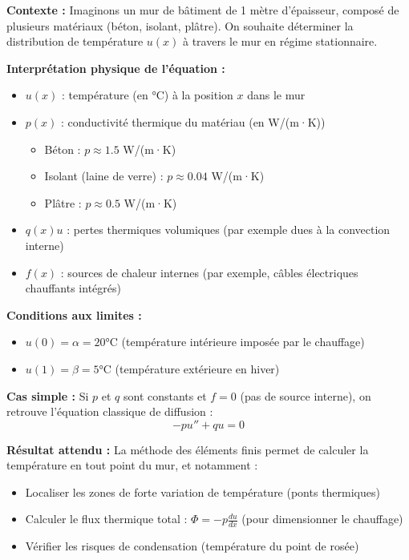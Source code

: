 \documentclass[11pt,a4paper]{report}
\begin{document}
\begin{exempleBox}
\textbf{Contexte :} Imaginons un mur de bâtiment de 1 mètre d'épaisseur, composé de plusieurs matériaux (béton, isolant, plâtre). On souhaite déterminer la distribution de température $u(x)$ à travers le mur en régime stationnaire.

\vspace{0.3cm}

\textbf{Interprétation physique de l'équation :}

\begin{itemize}
    \item \textbf{$u(x)$} : température (en °C) à la position $x$ dans le mur
    \item \textbf{$p(x)$} : conductivité thermique du matériau (en W/(m·K))
    \begin{itemize}
        \item Béton : $p \approx 1.5$ W/(m·K)
        \item Isolant (laine de verre) : $p \approx 0.04$ W/(m·K)
        \item Plâtre : $p \approx 0.5$ W/(m·K)
    \end{itemize}
    \item \textbf{$q(x) u$} : pertes thermiques volumiques (par exemple dues à la convection interne)
    \item \textbf{$f(x)$} : sources de chaleur internes (par exemple, câbles électriques chauffants intégrés)
\end{itemize}

\vspace{0.3cm}


\textbf{Conditions aux limites :}
\begin{itemize}
    \item $u(0) = \alpha = 20$°C (température intérieure imposée par le chauffage)
    \item $u(1) = \beta = 5$°C (température extérieure en hiver)
\end{itemize}

\vspace{0.3cm}

\textbf{Cas simple :} Si $p$ et $q$ sont constants et $f = 0$ (pas de source interne), on retrouve l'équation classique de diffusion :
\[
-p u'' + q u = 0
\]

\textbf{Résultat attendu :} La méthode des éléments finis permet de calculer la température en tout point du mur, et notamment :
\begin{itemize}
    \item Localiser les zones de forte variation de température (ponts thermiques)
    \item Calculer le flux thermique total : $\Phi = -p \frac{du}{dx}$ (pour dimensionner le chauffage)
    \item Vérifier les risques de condensation (température du point de rosée)
\end{itemize}
\end{exempleBox}
\end{document}

